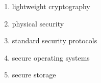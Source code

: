 \documentclass{article}
\begin{document}
\begin{enumerate}
\begin{enumerate}
\item lightweight cryptography
\item physical security
\item standard security protocols
\item secure operating systems
\item secure storage
\end{enumerate}

\end{enumerate}
\end{document}
